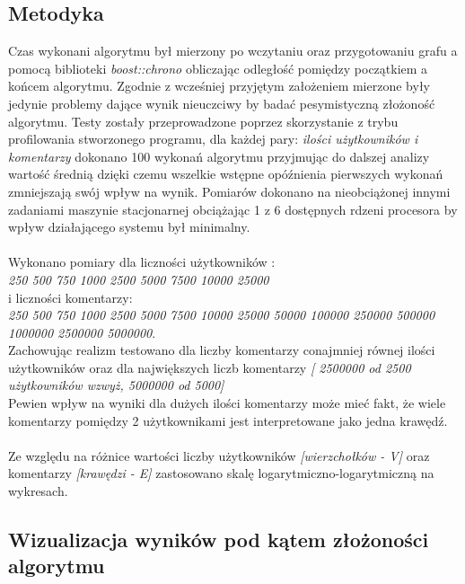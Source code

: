 \documentclass[11pt]{article}
\newcommand{\+}{\discretionary{\mbox{\scriptsize$\hookleftarrow$}}{}{}}
\begin{document}
\subsection{Metodyka}
Czas wykonani algorytmu był mierzony po wczytaniu oraz przygotowaniu grafu a pomocą biblioteki \textsl{boost::chrono} obliczając odległość pomiędzy początkiem a końcem algorytmu. Zgodnie z wcześniej przyjętym założeniem mierzone były jedynie problemy dające wynik nieuczciwy by badać pesymistyczną złożoność algorytmu. Testy zostały przeprowadzone poprzez skorzystanie z trybu profilowania stworzonego programu, dla każdej pary: \textsl{ilości użytkowników i komentarzy} dokonano 100 wykonań algorytmu przyjmując do dalszej analizy wartość średnią dzięki czemu wszelkie wstępne opóźnienia pierwszych wykonań zmniejszają swój wpływ na wynik. Pomiarów dokonano na nieobciążonej innymi zadaniami maszynie stacjonarnej obciążając 1 z 6 dostępnych rdzeni procesora by wpływ działającego systemu był minimalny.\\ \\
Wykonano pomiary dla liczności użytkowników : \\
\textit{250 500 750 1000 2500 5000 7500 10000 25000} \\
i liczności komentarzy:\\
\textit{250 500 750 1000 2500 5000 7500 10000 25000 50000 100000 250000 500000 1000000 2500000 5000000}.\\
Zachowując realizm testowano dla liczby komentarzy conajmniej równej ilości użytkowników oraz dla największych liczb komentarzy \textit{[ 2500000 od 2500 użytkowników wzwyż, 5000000 od 5000]}\\
Pewien wpływ na wyniki dla dużych ilości komentarzy może mieć fakt, że wiele komentarzy pomiędzy 2 użytkownikami jest interpretowane jako jedna krawędź.\\\\
Ze względu na różnice wartości liczby użytkowników \textit{[wierzchołków - V]} oraz komentarzy \textit{[krawędzi - E]} zastosowano skalę logarytmiczno-logarytmiczną na wykresach.
\subsection{Wizualizacja wyników pod kątem złożoności algorytmu}
\end{document}
